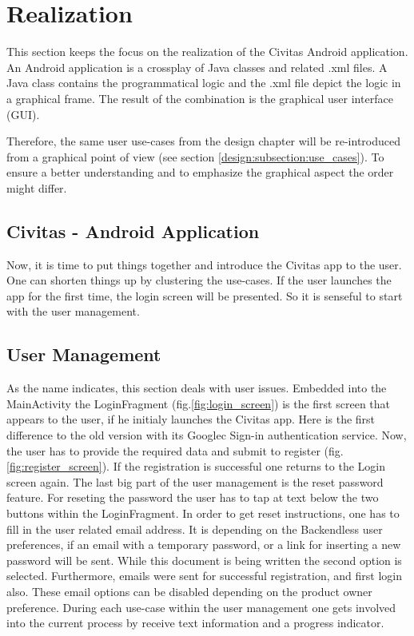 \newpage
\chapter{Realization}
\label{cap:Realization}
This section keeps the focus on the realization of the Civitas Android application.  
An Android application is a crossplay of Java classes and related .xml files. A Java class contains the programmatical logic and the .xml file depict the logic in a graphical frame. The result of the combination is the graphical user interface (GUI).

Therefore, the same user use-cases from the design chapter will be re-introduced from a graphical point of view (see section \ref{design:subsection:use_cases}). To ensure a better understanding and to emphasize the graphical aspect the order might differ.


\section{Civitas - Android Application}

Now, it is time to put things together and introduce the Civitas app to the user. One can shorten things up by clustering the use-cases. If the user launches the app for the first time, the login screen will be presented. So it is senseful to start with the user management.

\section{User Management}
As the name indicates, this section deals with user issues. Embedded into the MainActivity the LoginFragment (fig.\ref{fig:login_screen}) is the first screen that appears to the user, if he initialy launches the Civitas app. Here is the first difference to the old version with its Googlec Sign-in authentication service. Now, the user has to provide the required data and submit to register (fig. \ref{fig:register_screen}). If the registration is successful one returns to the Login screen again. 
The last big part of the user management is the reset password feature. For reseting the password the user has to tap at text below the two buttons within the LoginFragment. In order to get reset instructions, one has to fill in the user related email address. It is depending on the Backendless user preferences, if an email with a temporary password, or a link for inserting a new password will be sent. While this document is being written the second option is selected. Furthermore, emails were sent for successful registration, and first login also. These email options can be disabled depending on the product owner preference. During each use-case within the user management one gets involved into the current process by receive text information and a progress indicator. 

